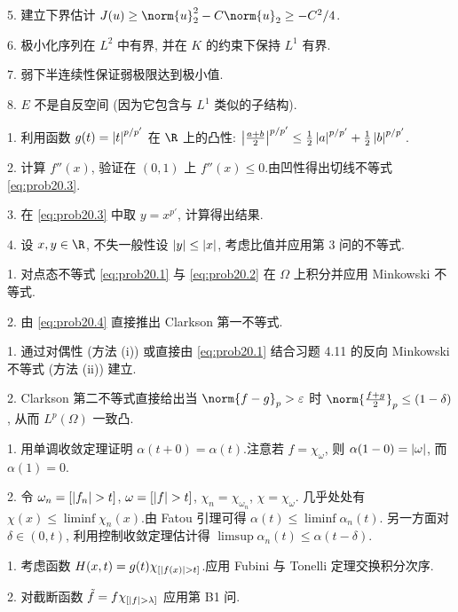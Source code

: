 5. 建立下界估计 $J(u)\ge\norm{u}_2^2-C\norm{u}_2\ge-C^2/4$.

6. 极小化序列在 $L^2$ 中有界, 并在 $K$ 的约束下保持 $L^1$ 有界.

7. 弱下半连续性保证弱极限达到极小值.

8. $E$ 不是自反空间 (因为它包含与 $L^1$ 类似的子结构).



1. 利用函数 $g(t)=\left|t\right|^{p/p'}$ 在 $\R$ 上的凸性:
$\left|\frac{a+b}{2}\right|^{p/p'}\le\frac12\left|a\right|^{p/p'}+\frac12\left|b\right|^{p/p'}$.

2. 计算 $f''(x)$, 验证在 $(0,1)$ 上 $f''(x)\le0$.由凹性得出切线不等式 \eqref{eq:prob20.3}.

3. 在 \eqref{eq:prob20.3} 中取 $y=x^{p'}$, 计算得出结果.

4. 设 $x,y\in\R$, 不失一般性设 $\left|y\right|\le\left|x\right|$, 考虑比值并应用第 3 问的不等式.


1. 对点态不等式 \eqref{eq:prob20.1} 与 \eqref{eq:prob20.2} 在 $\Omega$ 上积分并应用 Minkowski 不等式.

2. 由 \eqref{eq:prob20.4} 直接推出 Clarkson 第一不等式.


1. 通过对偶性 (方法 (i)) 或直接由 \eqref{eq:prob20.1} 结合习题 4.11 的反向 Minkowski 不等式 (方法 (ii)) 建立.

2. Clarkson 第二不等式直接给出当 $\norm{f-g}_p>\varepsilon$ 时
$\norm{\frac{f+g}{2}}_p\le(1-\delta)$, 从而 $L^p(\Omega)$ 一致凸.



1. 用单调收敛定理证明 $\alpha(t+0)=\alpha(t)$.注意若 $f=\chi_\omega$, 则
$\alpha(1-0)=\left|\omega\right|$, 而 $\alpha(1)=0$.

2. 令 $\omega_n=[\abs{f_n}>t]$, $\omega=[\abs{f}>t]$, $\chi_n=\chi_{\omega_n}$, $\chi=\chi_\omega$.
几乎处处有 $\chi(x)\le\liminf\chi_n(x)$.由 Fatou 引理可得 $\alpha(t)\le\liminf\alpha_n(t)$.
另一方面对 $\delta\in(0,t)$, 利用控制收敛定理估计得 $\limsup\alpha_n(t)\le\alpha(t-\delta)$.


1. 考虑函数 $H(x,t)=g(t)\chi_{[\abs{f(x)}>t]}$.应用 Fubini 与 Tonelli 定理交换积分次序.

2. 对截断函数 $\tilde f=f\chi_{[\abs{f}>\lambda]}$ 应用第 B1 问.

